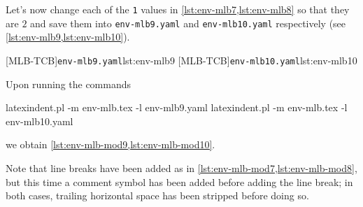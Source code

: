   \begin{example}
  Let's now change each of the \texttt{1} values in \cref{lst:env-mlb7,lst:env-mlb8} so
  that they are $2$ and save them into \texttt{env-mlb9.yaml} and \texttt{env-mlb10.yaml}
  respectively (see \cref{lst:env-mlb9,lst:env-mlb10}). 

  \begin{cmhtcbraster}
   [MLB-TCB]{\texttt{env-mlb9.yaml}}{lst:env-mlb9}
   [MLB-TCB]{\texttt{env-mlb10.yaml}}{lst:env-mlb10}
  \end{cmhtcbraster}

  Upon running the commands

  \begin{commandshell}
latexindent.pl -m env-mlb.tex -l env-mlb9.yaml
latexindent.pl -m env-mlb.tex -l env-mlb10.yaml
\end{commandshell}

  we obtain \cref{lst:env-mlb-mod9,lst:env-mlb-mod10}.

  \begin{widepage}
   \begin{minipage}{.43\linewidth}
   \end{minipage}
   \hfill
   \begin{minipage}{.56\linewidth}
   \end{minipage}
  \end{widepage}

  Note that line breaks have been added as in \cref{lst:env-mlb-mod7,lst:env-mlb-mod8},
  but this time a comment symbol has been added before adding the line break; in both
  cases, trailing horizontal space has been stripped before doing so.
  \end{example}

